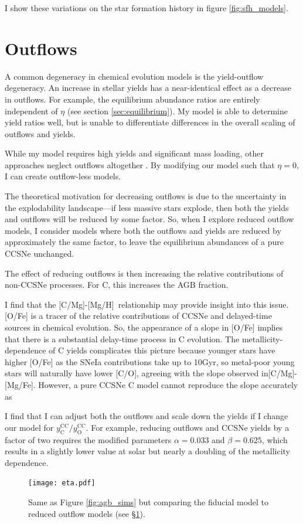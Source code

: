\documentclass[12pt,oneside]{report}
\newcommand{\caah}{[C/Mg]-[Mg/H]}
\newcommand{\caafe}{[C/Mg]-[Mg/Fe]}
\begin{document}
I show these variations on the star formation history in figure \ref{fig:sfh_models}.


\section{Outflows} \label{sec:outflows}

A common degeneracy in chemical evolution models is the yield-outflow degeneracy. An increase in stellar yields has a near-identical effect as a decrease in outflows. For example, the equilibrium abundance ratios are entirely independent of $\eta$ (see section \ref{sec:equilibrium}). My model is able to determine yield ratios well, but is unable to differentiate differences in the overall scaling of outflows and yields.

While my model requires high yields and significant mass loading, other approaches neglect outflows altogether \citep{MCM13, MCM14, spitoni19, spitoni20, spitoni21}. By modifying our model such that $\eta=0$, I can create outflow-less models.


The theoretical motivation for decreasing outflows is due to the uncertainty in the explodability landscape---if less massive stars explode, then both the yields and outflows will be reduced by some factor. So, when I explore reduced outflow models, I consider models where both the outflows and yields are reduced by approximately the same factor, to leave the equilibrium abundances of a pure CCSNe unchanged. 

The effect of reducing outflows is then increasing the relative contributions of non-CCSNe processes. For C, this increases the AGB fraction.

I find that the \caah~relationship may provide insight into this issue. [O/Fe] is a tracer of the relative contributions of CCSNe and delayed-time sources in chemical evolution. So, the appearance of a slope in [O/Fe] implies that there is a substantial delay-time process in C evolution. 
The metallicity-dependence of C yields complicates this picture because
younger stars have higher [O/Fe] as the SNeIa contributions take up to 10Gyr,
so metal-poor young stars will naturally have lower [C/O], agreeing with the
slope observed in\caafe. However, a pure CCSNe C model cannot reproduce the slope accurately as  


I find that I can adjust both the outflows and scale down the yields if I change our model for $y_\text{C}^\text{CC}/y_\text{O}^\text{CC}$. For example, reducing outflows and CCSNe yields by a factor of two requires the modified parameters
$\alpha = 0.033$ and $\beta = 0.625$, which results in a slightly lower value at solar but nearly a doubling of the metallicity dependence.
\begin{figure}

\texttt{[image: eta.pdf]}

\caption[Reduced-outflow models]{Same as Figure \ref{fig:agb_sims} but comparing the fiducial model to reduced outflow models (see \S \ref{sec:outflows}).}
\end{figure}
\end{document}
